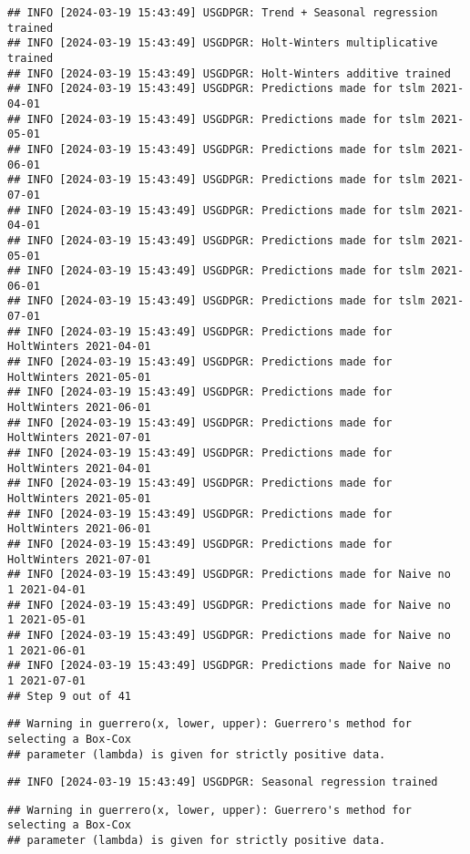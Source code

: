 \documentclass[
]{article}
\begin{document}
\begin{verbatim}
## INFO [2024-03-19 15:43:49] USGDPGR: Trend + Seasonal regression trained
## INFO [2024-03-19 15:43:49] USGDPGR: Holt-Winters multiplicative trained
## INFO [2024-03-19 15:43:49] USGDPGR: Holt-Winters additive trained
## INFO [2024-03-19 15:43:49] USGDPGR: Predictions made for tslm 2021-04-01
## INFO [2024-03-19 15:43:49] USGDPGR: Predictions made for tslm 2021-05-01
## INFO [2024-03-19 15:43:49] USGDPGR: Predictions made for tslm 2021-06-01
## INFO [2024-03-19 15:43:49] USGDPGR: Predictions made for tslm 2021-07-01
## INFO [2024-03-19 15:43:49] USGDPGR: Predictions made for tslm 2021-04-01
## INFO [2024-03-19 15:43:49] USGDPGR: Predictions made for tslm 2021-05-01
## INFO [2024-03-19 15:43:49] USGDPGR: Predictions made for tslm 2021-06-01
## INFO [2024-03-19 15:43:49] USGDPGR: Predictions made for tslm 2021-07-01
## INFO [2024-03-19 15:43:49] USGDPGR: Predictions made for HoltWinters 2021-04-01
## INFO [2024-03-19 15:43:49] USGDPGR: Predictions made for HoltWinters 2021-05-01
## INFO [2024-03-19 15:43:49] USGDPGR: Predictions made for HoltWinters 2021-06-01
## INFO [2024-03-19 15:43:49] USGDPGR: Predictions made for HoltWinters 2021-07-01
## INFO [2024-03-19 15:43:49] USGDPGR: Predictions made for HoltWinters 2021-04-01
## INFO [2024-03-19 15:43:49] USGDPGR: Predictions made for HoltWinters 2021-05-01
## INFO [2024-03-19 15:43:49] USGDPGR: Predictions made for HoltWinters 2021-06-01
## INFO [2024-03-19 15:43:49] USGDPGR: Predictions made for HoltWinters 2021-07-01
## INFO [2024-03-19 15:43:49] USGDPGR: Predictions made for Naive no  1 2021-04-01
## INFO [2024-03-19 15:43:49] USGDPGR: Predictions made for Naive no  1 2021-05-01
## INFO [2024-03-19 15:43:49] USGDPGR: Predictions made for Naive no  1 2021-06-01
## INFO [2024-03-19 15:43:49] USGDPGR: Predictions made for Naive no  1 2021-07-01
## Step 9 out of 41
\end{verbatim}

\begin{verbatim}
## Warning in guerrero(x, lower, upper): Guerrero's method for selecting a Box-Cox
## parameter (lambda) is given for strictly positive data.
\end{verbatim}

\begin{verbatim}
## INFO [2024-03-19 15:43:49] USGDPGR: Seasonal regression trained
\end{verbatim}

\begin{verbatim}
## Warning in guerrero(x, lower, upper): Guerrero's method for selecting a Box-Cox
## parameter (lambda) is given for strictly positive data.
\end{verbatim}
\end{document}
